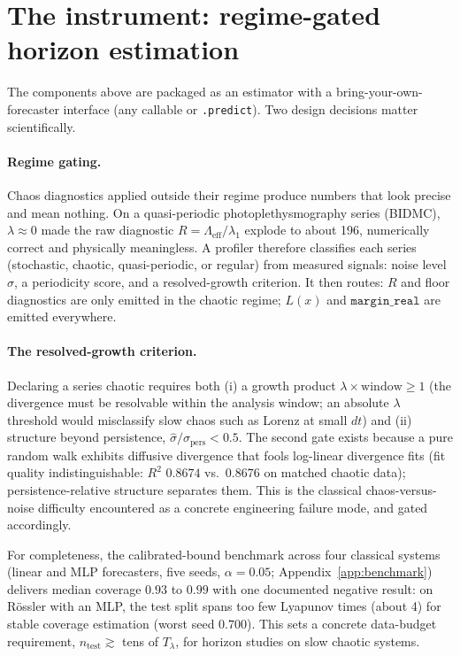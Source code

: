 \documentclass[aps,pre,twocolumn,superscriptaddress,nofootinbib,longbibliography]{revtex4-2}
\newcommand{\Tlyap}{T_\lambda}
\newcommand{\eff}{\mathrm{eff}}
\begin{document}
\section{The instrument: regime-gated horizon estimation}
\label{sec:instrument}

The components above are packaged as an estimator with a
bring-your-own-forecaster interface (any callable or \texttt{.predict}).
Two design decisions matter scientifically.

\paragraph{Regime gating.} Chaos diagnostics applied outside their regime
produce numbers that look precise and mean nothing. On a quasi-periodic
photoplethysmography series (BIDMC), $\lambda \approx 0$ made the raw
diagnostic $R = \Lambda_\eff/\lambda_1$ explode to about 196, numerically
correct and physically meaningless. A profiler therefore classifies each
series (stochastic, chaotic, quasi-periodic, or regular) from measured
signals: noise level $\hat\sigma$, a periodicity score, and a
resolved-growth criterion. It then routes: $R$ and floor diagnostics are
only emitted in the chaotic regime; $L(x)$ and $\texttt{margin\_real}$
are emitted everywhere.

\paragraph{The resolved-growth criterion.} Declaring a series chaotic
requires both (i) a growth product $\lambda \times \mathrm{window} \ge 1$
(the divergence must be resolvable within the analysis window; an
absolute $\lambda$ threshold would misclassify slow chaos such as Lorenz
at small $dt$) and (ii) structure beyond persistence, $\hat\sigma /
\sigma_{\mathrm{pers}} < 0.5$. The second gate exists because a pure
random walk exhibits diffusive divergence that fools log-linear
divergence fits (fit quality indistinguishable: $R^2$ $0.8674$ vs.\
$0.8676$ on matched chaotic data); persistence-relative structure
separates them. This is the classical chaos-versus-noise difficulty
\citep{cencini2000chaos,gao2006distinguishing} encountered as a concrete
engineering failure mode, and gated accordingly.

For completeness, the calibrated-bound benchmark across four classical
systems (linear and MLP forecasters, five seeds, $\alpha = 0.05$;
Appendix~\ref{app:benchmark}) delivers median coverage $0.93$ to $0.99$
with one documented negative result: on R\"ossler with an MLP, the test
split spans too few Lyapunov times (about 4) for stable coverage
estimation (worst seed $0.700$). This sets a concrete data-budget
requirement, $n_{\mathrm{test}} \gtrsim$ tens of $\Tlyap$, for horizon
studies on slow chaotic systems.
\end{document}
